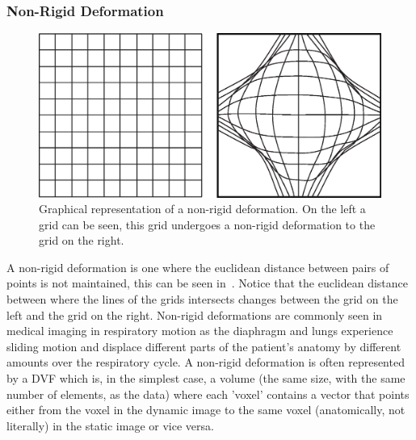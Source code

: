             \subsubsection{Non-Rigid Deformation} \label{sec:non_rigid_deformation}
                \begin{figure}
                    \centering
                    
                    \includegraphics[width=1.0\linewidth]{figures/background_nRD.png}
                    
                    \captionsetup{singlelinecheck=false, justification=raggedright}
                    \caption{Graphical representation of a non-rigid deformation. On the left a grid can be seen, this grid undergoes a non-rigid deformation to the grid on the right.} \label{fig:non_rigid_deformation_nRD}
                \end{figure}
                
                A non-rigid deformation is one where the euclidean distance between pairs of points is not maintained, this can be seen in~. Notice that the euclidean distance between where the lines of the grids intersects changes between the grid on the left and the grid on the right. %
                Non-rigid deformations are commonly seen in medical imaging in respiratory motion as the diaphragm and lungs experience sliding motion and displace different parts of the patient's anatomy by different amounts over the respiratory cycle. A non-rigid deformation is often represented by a \gls{DVF} which is, in the simplest case, a volume (the same size, with the same number of elements, as the data) where each 'voxel' contains a vector that points either from the voxel in the dynamic image to the same voxel (anatomically, not literally) in the static image or vice versa.
                
